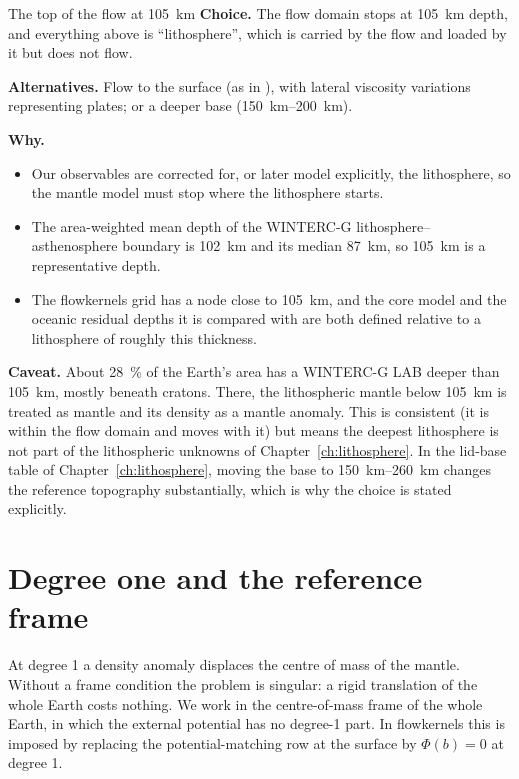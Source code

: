 \begin{decision}{The top of the flow at \qty{105}{km}}
\textbf{Choice.} The flow domain stops at \qty{105}{km} depth, and everything above is ``lithosphere'', which is carried by the flow and loaded by it but does not flow.

\textbf{Alternatives.} Flow to the surface (as in \citet{hager_lower_1985}), with lateral viscosity variations representing plates; or a deeper base (\qtyrange{150}{200}{km}).

\textbf{Why.}
\begin{itemize}[nosep]
\item Our observables are corrected for, or later model explicitly, the lithosphere, so the mantle model must stop where the lithosphere starts.
\item The area-weighted mean depth of the WINTERC-G lithosphere--asthenosphere boundary is \qty{102}{km} and its median \qty{87}{km}, so \qty{105}{km} is a representative depth.
\item The flowkernels grid has a node close to \qty{105}{km}, and the core model and the oceanic residual depths it is compared with are both defined relative to a lithosphere of roughly this thickness.
\end{itemize}
\textbf{Caveat.} About \qty{28}{\percent} of the Earth's area has a WINTERC-G LAB deeper than \qty{105}{km}, mostly beneath cratons.
There, the lithospheric mantle below \qty{105}{km} is treated as mantle and its density as a mantle anomaly.
This is consistent (it is within the flow domain and moves with it) but means the deepest lithosphere is not part of the lithospheric unknowns of Chapter~\ref{ch:lithosphere}.
In the lid-base table of Chapter~\ref{ch:lithosphere}, moving the base to \qtyrange{150}{260}{km} changes the reference topography substantially, which is why the choice is stated explicitly.
\end{decision}

\section{Degree one and the reference frame}

At degree 1 a density anomaly displaces the centre of mass of the mantle.
Without a frame condition the problem is singular: a rigid translation of the whole Earth costs nothing.
We work in the centre-of-mass frame of the whole Earth, in which the external potential has no degree-1 part.
In flowkernels this is imposed by replacing the potential-matching row at the surface by $\Phi(b) = 0$ at degree 1.

